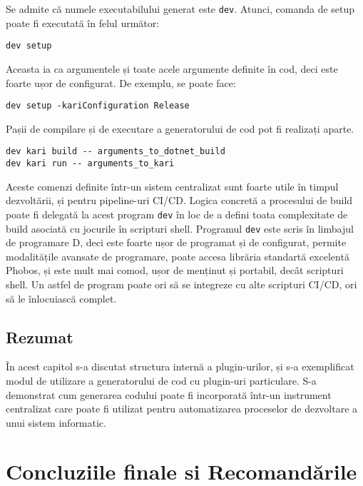 \documentclass[a4paper,12pt]{report}
\begin{document}
Se admite că numele executabilului generat este \texttt{dev}.
Atunci, comanda de setup poate fi executată în felul următor:

\begin{verbatim}
dev setup
\end{verbatim}

Aceasta ia ca argumentele și toate acele argumente definite în cod, deci este foarte ușor de configurat.
De exemplu, se poate face:

\begin{verbatim}
dev setup -kariConfiguration Release
\end{verbatim}

Pașii de compilare și de executare a generatorului de cod pot fi realizați aparte.

\begin{verbatim}
dev kari build -- arguments_to_dotnet_build
dev kari run -- arguments_to_kari
\end{verbatim}

Aceste comenzi definite într-un sistem centralizat sunt foarte utile în timpul dezvoltării, și pentru pipeline-uri CI/CD.
Logica concretă a procesului de build poate fi delegată la acest program \texttt{dev} în loc de a defini toata complexitate de build asociată cu jocurile în scripturi shell.
Programul \texttt{dev} este scris în limbajul de programare D, deci este foarte ușor de programat și de configurat, permite modalitățile avansate de programare, poate accesa librăria standartă excelentă Phobos, și este mult mai comod, ușor de menținut și portabil, decât scripturi shell.
Un astfel de program poate ori să se integreze cu alte scripturi CI/CD, ori să le înlocuiască complet.

\section{Rezumat}

În acest capitol s-a discutat structura internă a plugin-urilor, și s-a exemplificat modul de utilizare a generatorului de cod cu plugin-uri particulare.
S-a demonstrat cum generarea codului poate fi incorporată într-un instrument centralizat care poate fi utilizat pentru automatizarea proceselor de dezvoltare a unui sistem informatic.

\chapter{Concluziile finale si Recomandările}
\end{document}
